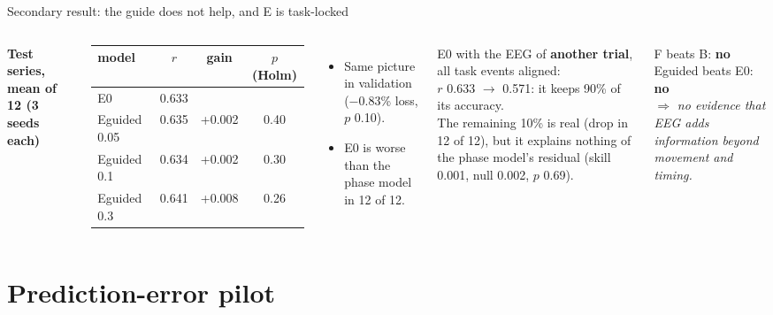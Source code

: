 \documentclass[aspectratio=169,10pt]{beamer}
\begin{document}
\begin{frame}{Secondary result: the guide does not help, and E is task-locked}
  \begin{columns}[T]
    \textbf{Test series, mean of 12 (3 seeds each)}

    \smallskip
    \centering\scriptsize
    \begin{tabular}{lccc}
      \toprule
      model & $r$ & gain & $p$ (Holm) \\
      \midrule
      E0 & 0.633 & & \\
      Eguided 0.05 & 0.635 & +0.002 & 0.40 \\
      Eguided 0.1 & 0.634 & +0.002 & 0.30 \\
      Eguided 0.3 & 0.641 & +0.008 & 0.26 \\
      \bottomrule
    \end{tabular}
    \raggedright
    \begin{itemize}\scriptsize
      \item Same picture in validation ($-0.83$\% loss, $p$ 0.10).
      \item E0 is worse than the phase model in 12 of 12.
    \end{itemize}
    \begin{tcolorbox}[stagebox,title={The strongest single number}]
      \scriptsize
      E0 with the EEG of \textbf{another trial}, all task events aligned:\\
      $r$ 0.633 $\to$ \alert{0.571}: it keeps \alert{90\%} of its accuracy.\\[2pt]
      The remaining 10\% is real (drop in 12 of 12), but it explains nothing of the phase model's residual
      (skill 0.001, null 0.002, $p$ 0.69).
    \end{tcolorbox}
    \vspace{2pt}
    \begin{tcolorbox}[notebox,title={Verdict (step 8), every horizon}]
      F beats B: \textbf{no} \quad Eguided beats E0: \textbf{no}\\
      $\Rightarrow$ \emph{no evidence that EEG adds information beyond movement and timing.}
    \end{tcolorbox}
  \end{columns}
\end{frame}

\section{Prediction-error pilot}
\end{document}
